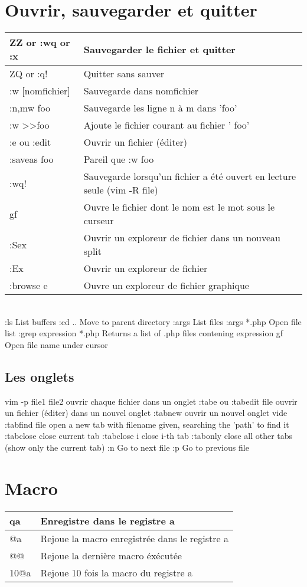 \documentclass{article}
\begin{document}
\section{Ouvrir, sauvegarder et quitter}
\begin{tabular}{|p{3cm}| l| }
\hline
ZZ or :wq or :x & Sauvegarder le fichier et quitter\\ \hline
ZQ or :q! & Quitter sans sauver\\ \hline
:w [nomfichier]& Sauvegarde dans nomfichier \\ \hline
:n,mw foo & Sauvegarde les ligne n à m dans 'foo' \\ \hline
:w \textgreater \textgreater foo & Ajoute le fichier courant au fichier ' foo'\\ \hline
:e ou :edit & Ouvrir un fichier (éditer) \\ \hline
:saveas foo & Pareil que :w foo \\ \hline
:wq! & Sauvegarde lorsqu'un fichier a été ouvert en lecture seule (vim -R file) \\ \hline
gf & Ouvre le fichier dont le nom est le mot sous le curseur\\ \hline
:Sex & Ouvrir un exploreur de fichier dans un nouveau split\\ \hline
:Ex & Ouvrir un exploreur de fichier\\ \hline
:browse e & Ouvre un exploreur de fichier graphique\\ \hline
\end{tabular}\\

:ls List buffers
:cd .. Move to parent directory
:args List files
:args *.php Open file list
:grep expression *.php Returns a list of .php files contening expression
gf Open file name under cursor
\subsection{Les onglets}
vim -p file1 file2 ouvrir chaque fichier dans un onglet
:tabe ou :tabedit {file} ouvrir un fichier (éditer) dans un nouvel onglet
:tabnew ouvrir un nouvel onglet vide
:tabfind {file} open a new tab with filename given, searching the 'path' to find it
:tabclose close current tab
:tabclose {i} close i-th tab
:tabonly close all other tabs (show only the current tab)
:n Go to next file
:p Go to previous file

\section{Macro}
\begin{tabular}{|p{3cm}| l| }\hline
qa & Enregistre dans le registre a \\ \hline
@a & Rejoue la macro enregistrée dans le registre a \\ \hline
@@ & Rejoue la dernière macro éxécutée \\ \hline
10@a & Rejoue 10 fois la macro du registre a \\ \hline
\end{tabular}\\
\end{document}
